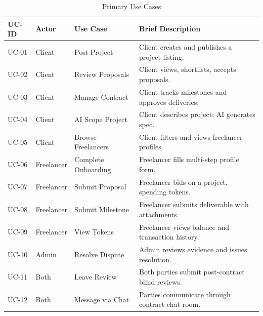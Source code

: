 \begin{table}[H]
\centering
\caption{Primary Use Cases}
\begin{tabularx}{\textwidth}{lllX}
\toprule
\textbf{UC-ID} & \textbf{Actor} & \textbf{Use Case} & \textbf{Brief Description} \\
\midrule
UC-01 & Client     & Post Project         & Client creates and publishes a project listing. \\
UC-02 & Client     & Review Proposals     & Client views, shortlists, accepts proposals. \\
UC-03 & Client     & Manage Contract      & Client tracks milestones and approves deliveries. \\
UC-04 & Client     & AI Scope Project     & Client describes project; AI generates spec. \\
UC-05 & Client     & Browse Freelancers   & Client filters and views freelancer profiles. \\
UC-06 & Freelancer & Complete Onboarding  & Freelancer fills multi-step profile form. \\
UC-07 & Freelancer & Submit Proposal      & Freelancer bids on a project, spending tokens. \\
UC-08 & Freelancer & Submit Milestone     & Freelancer submits deliverable with attachments. \\
UC-09 & Freelancer & View Tokens          & Freelancer views balance and transaction history. \\
UC-10 & Admin      & Resolve Dispute      & Admin reviews evidence and issues resolution. \\
UC-11 & Both       & Leave Review         & Both parties submit post-contract blind reviews. \\
UC-12 & Both       & Message via Chat     & Parties communicate through contract chat room. \\
\bottomrule
\end{tabularx}
\end{table}
